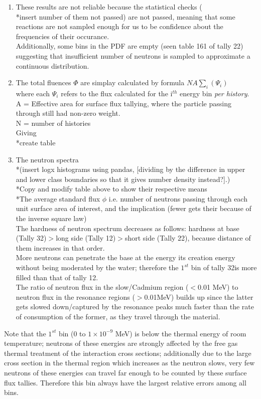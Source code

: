 \documentclass[a4paper, 12pt]{article}
\begin{document}
\begin{enumerate}
	\item These results are not reliable because the statistical checks (\\*insert number of them not passed) are not passed, meaning that some reactions are not sampled enough for us to be confidence about the frequencies of their occurance.
	\\Additionally, some bins in the PDF are empty (seen table 161 of tally 22) suggesting that insufficient number of neutrons is sampled to approximate a continuous distribution.
	\item The total fluences $\Phi$ are simplay calculated by formula $N A \sum_i (\Psi_i)$ 
		\\where each $\Psi_i$ refers to the flux calculated for the i${}^{th}$ energy bin \emph{per history}.
		\\      A = Effective area for surface flux tallying, where the particle passing through still had non-zero weight.
		\\      N = number of histories
		\\Giving \\*create table
	\item The neutron spectra 
	\\*(insert logx histograms using pandas, [dividing by the difference in upper and lower class boundaries so that it gives number density instead?].)
	\\*Copy and modify table above to show their respective means
	\\*The average standard flux $\phi$ i.e. number of neutrons passing through each unit surface area of interest, and the implication (fewer gets their because of the inverse square law)
	\\The hardness of neutron spectrum decreases as follows: hardness at base (Tally 32)$>$long side (Tally 12)$>$short side (Tally 22), because distance of them increases in that order.
	\\More neutrons can penetrate the base at the energy its creation energy without being moderated by the water; therefore the $1^{st}$ bin of tally 32is more filled than that of tally 12. 
	\\The ratio of neutron flux in the slow/Cadmium region ($<$0.01 MeV) to neutron flux in the resonance regions ($>$0.01MeV) builds up since the latter gets slowed down/captured by the resonance peaks much faster than the rate of consumption of the former, as they travel through the material.
\end{enumerate}
Note that the $1^{st}$ bin ($0$ to $1\times 10^{-9}$ MeV) is below the thermal energy of room temperature; neutrons of these energies are strongly affected by the free gas thermal treatment of the interaction cross sections; additionally due to the large cross section in the thermal region which increases as the neutron slows, very few neutrons of these energies can travel far enough to be counted by these surface flux tallies. Therefore this bin always have the largest relative errors among all bins.
\end{document}
